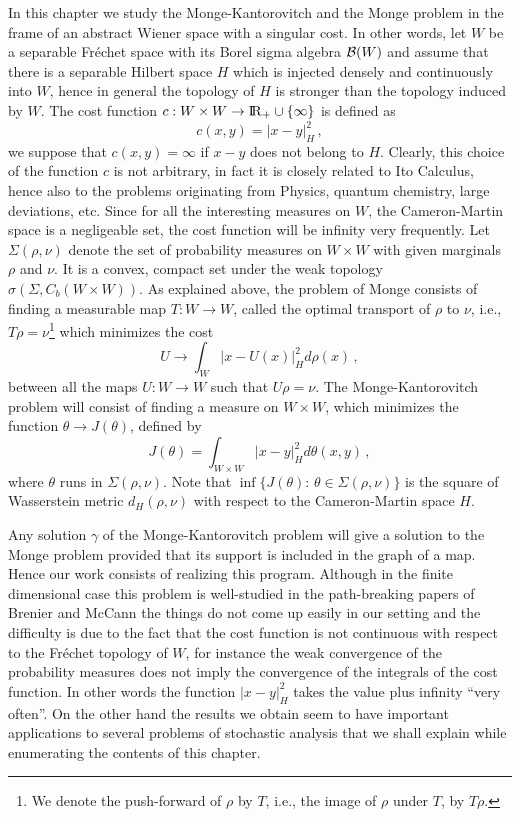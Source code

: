 \documentclass[12pt,a4paper]{book}
\newcommand{\reals}{{\rm I\!R}}
\newcommand{\ga}{\gamma}
\newcommand{\calB}{{\cal B}}
\begin{document}
In this chapter we study the Monge-Kantorovitch and the 
Monge   problem in the frame of an abstract  Wiener
space with a singular cost. In other words, let  $W$ be a separable
Fr\'echet space with its Borel sigma algebra 
$\calB(W)$ and assume that there is a separable  Hilbert space $H$ which is
injected densely and continuously into $W$, hence in general the
topology of $H$ is stronger than the topology induced by $W$. The cost
function $c:W\times W\to \reals_+\cup\{\infty\}$ is defined  as 
$$
c(x,y)=|x-y|_H^2\,,
$$
we suppose that $c(x,y)=\infty$ if $x-y$ does not belong to
$H$. Clearly, this
choice of the function $c$ is not arbitrary, in fact it is closely
related to Ito Calculus, hence also to the problems originating from 
Physics, quantum chemistry, large deviations, etc. Since
for all the interesting measures on $W$, the Cameron-Martin space is a
negligeable set, the cost function will be infinity very frequently. 
Let  $\Sigma(\rho,\nu)$ denote  the set  of probability measures 
on $W\times W$ with given marginals $\rho$ and $\nu$. It is a convex,  compact
 set under the weak topology $\sigma(\Sigma,C_b(W\times W))$. As
 explained above, the problem of Monge consists of finding a measurable map 
$T:W\to W$, called the optimal transport of $\rho$ to $\nu$, i.e.,
$T\rho=\nu$\footnote{We denote the
  push-forward of $\rho$ by $T$, i.e., the image of $\rho$ under $T$,  by $T\rho$.} which minimizes
the cost
$$
U\to  \int_W|x-U(x)|_H^2d\rho(x)\,,
$$
between all the maps $U:W\to W$ such that $U\rho=\nu$. The 
Monge-Kantorovitch  problem will   consist of
finding a  measure on $W\times W$,  which minimizes the function
$\theta\to J(\theta)$, defined by
\begin{equation}
\label{J-defn}
J(\theta)=\int_{W\times W}\big|x-y\big|_H^2d\theta(x,y)\,,
\end{equation}
where $\theta$ runs in $\Sigma(\rho,\nu)$. Note that 
$\inf\{J(\theta):\,\theta\in \Sigma(\rho,\nu)\}$ is the square of  Wasserstein
metric $d_H(\rho,\nu)$ with respect to the Cameron-Martin space $H$. 

Any solution $\ga$ of the
 Monge-Kantorovitch problem will give a solution to  the
Monge problem  provided that its support is included in
the graph of a map. Hence our work consists of realizing this program.
Although in  the finite dimensional case this problem is well-studied
in the path-breaking papers of Brenier \cite{BRE} and McCann \cite{Mc1,Mc2}
the things do not come up easily in our setting  and the  difficulty
is due to the 
fact that the cost function is not continuous with respect to the
Fr\'echet topology of $W$, for instance  the weak convergence of the
probability measures does not imply the convergence of the integrals  of
the cost function.  In other words the
function $|x-y|_H^2$ takes the value plus  infinity ``very
often''. On the other hand the results we obtain  seem to
have important applications to several problems of stochastic
analysis that we shall explain while enumerating the contents of this 
chapter. 
\end{document}

